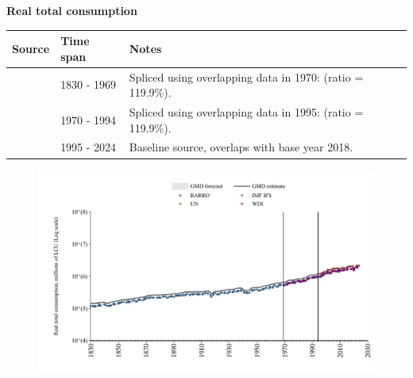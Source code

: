 \documentclass[12pt,a4paper,landscape]{article}
\begin{document}
\begin{adjustbox}{max totalsize={\paperwidth}{\paperheight},center}
\begin{minipage}[t][\textheight][t]{\textwidth}
\vspace*{0.5cm}
{}
\begin{center}
{\Large\bfseries Real total consumption}
\end{center}
\vspace{0.5cm}
\begin{table}[H]
\centering
\small
\begin{tabular}{|l|l|l|}
\hline
\textbf{Source} & \textbf{Time span} & \textbf{Notes} \\
\hline
\rowcolor{white}\cite{BARRO}& 1830 - 1969 &Spliced using overlapping data in 1970: (ratio = 119.9\%). \\
\rowcolor{lightgray}\cite{WDI}& 1970 - 1994 &Spliced using overlapping data in 1995: (ratio = 119.9\%). \\
\rowcolor{white}\cite{IMF_IFS}& 1995 - 2024 &Baseline source, overlaps with base year 2018. \\
\hline
\end{tabular}
\end{table}
\begin{figure}[H]
\centering
\includegraphics[width=\textwidth,height=0.6\textheight,keepaspectratio]{graphs/GBR_rcons.pdf}
\end{figure}
\end{minipage}
\end{adjustbox}
\end{document}
